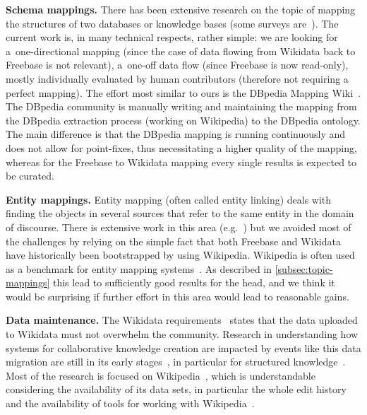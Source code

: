 \documentclass{acm_proc_article-sp}
\begin{document}
\textbf{Schema mappings.}
There has been extensive research on the topic of mapping the structures
of two databases or knowledge bases
(some surveys are~\cite{mappingsurvey1,mappingsurvey2,mappingsurvey3}).
The current work is, in many technical respects, rather simple:
we are looking for a~one-directional mapping (since the case of data
flowing from Wikidata back to Freebase is not relevant),
a~one-off data flow (since Freebase is now read-only),
mostly individually evaluated by human contributors
(therefore not requiring a perfect mapping).
The effort most similar to ours is the DBpedia Mapping Wiki~\cite{lehmann2014dbpedia}.
The DBpedia community is manually writing and maintaining the mapping from
the DBpedia extraction process (working on Wikipedia) to the DBpedia ontology.
The main difference is that the DBpedia mapping is running continuously
and does not allow for point-fixes, thus necessitating a higher quality of the mapping,
whereas for the Freebase to Wikidata mapping every single results is expected to be curated.

\textbf{Entity mappings.}
Entity mapping (often called entity linking) deals with finding the objects
in several sources that refer to the same entity in the domain of discourse.
There is extensive work in this area (e.g.~\cite{entitylinkingsurvey1,entitylinkingsurvey2})
but we avoided most of the challenges by relying on the simple fact that
both Freebase and Wikidata have historically been bootstrapped by using Wikipedia.
Wikipedia is often used as a benchmark for entity mapping systems~\cite{entitylinkingwikipedia}.
As described in \autoref{subsec:topic-mappings} this lead to sufficiently good results for the head,
and we think it would be surprising if further effort in this area would lead to reasonable gains.

\textbf{Data maintenance.}
The Wikidata requirements~\cite{wikidatareqs} states that the data uploaded to Wikidata
must not overwhelm the community.
Research in understanding how systems for collaborative knowledge creation are impacted
by events like this data migration are still in its early stages~\cite{moskaliuk2012collaborative},
in particular for structured knowledge~\cite{horridge2014webprotege}.
Most of the research is focused on Wikipedia~\cite{flock2015towards},
which is understandable considering the availability of its data sets,
in particular the whole edit history~\cite{schindler2011introducing}
and the availability of tools for working with Wikipedia~\cite{milne2013open}.

\end{document}
